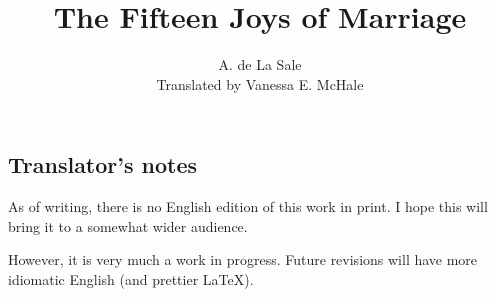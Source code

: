 \documentclass{book}
\begin{document}
\title{The Fifteen Joys of Marriage}
\author{A. de La Sale\\
Translated by Vanessa E. McHale}
\date{}
\maketitle
\tableofcontents

\subsection*{Translator's notes}
As of writing, there is no English edition of this work in print. I hope this will bring it to a somewhat wider audience.

However, it is very much a work in progress. Future revisions will have more idiomatic English (and prettier \LaTeX). 
\end{document}
